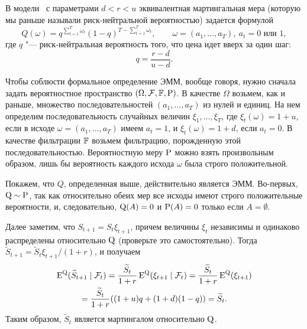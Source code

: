 \begin{example}
В модели \crr\ с параметрами $d<r<u$ эквивалентная мартингальная мера (которую мы раньше называли риск-нейтральной вероятностью) задается формулой 
\[
Q(\omega) = q^{\sum_{t=1}^T \omega_t}(1-q)^{T-\sum_{t=1}^T \omega_t}, \qquad 
\omega=(a_1,\dots,a_T),\ a_t=0\text{ или }1,
\]
где $q$ "--- риск-нейтральная вероятность того, что цена идет вверх за один шаг:
\[
q = \frac{r-d}{u-d}.
\]

Чтобы соблюсти формальное определение ЭММ, вообще говоря, нужно сначала задать вероятностное пространство $(\Omega,\F,\FF,\P)$.
В качестве $\Omega$ возьмем, как и раньше, множество последовательностей $(a_1,\dots,a_T)$ из нулей и единиц.
На нем определим последовательность случайных величин $\xi_1,\dots,\xi_T$, где $\xi_t(\omega) = 1+u$, если в исходе $\omega=(a_1,\dots,a_T)$ имеем $a_t=1$, и $\xi_t(\omega) = 1+d$, если $a_t=0$.
В качестве фильтрации $\FF$ возьмем фильтрацию, порожденную этой последовательностью. 
Вероятностную меру $\P$ можно взять произвольным образом, лишь бы вероятность каждого исхода $\omega$ была строго положительной.

Покажем, что $Q$, определенная выше, действительно является ЭММ.
Во-первых, $\Q\sim\P$, так как относительно обеих мер все исходы имеют строго положительные вероятности, и, следовательно, $\Q(A) = 0$ и $\P(A)=0$ только если $A=\emptyset$.

Далее заметим, что $S_{t+1} = S_t\xi_{t+1}$, причем величины $\xi_t$ независимы и одинаково распределены относительно $\Q$ (проверьте это самостоятельно). 
Тогда $\tilde S_{t+1} = \tilde S_t \xi_{t+1}/(1+r)$, и получаем
\begin{multline*}
\E^{\Q} (\tilde S_{t+1} \mid \F_t)
= \frac{\tilde S_t}{1+r} \E^{\Q} (\xi_{t+1} \mid \F_t)
= \frac{\tilde S_t}{1+r} \E^{\Q} (\xi_{t+1}) \\
= \frac{\tilde S_t}{1+r} ((1+u)q + (1+d)(1-q))
= \tilde S_t.  
\end{multline*}
Таким образом, $\tilde S_t$ является мартингалом относительно $\Q$.
\end{example}

